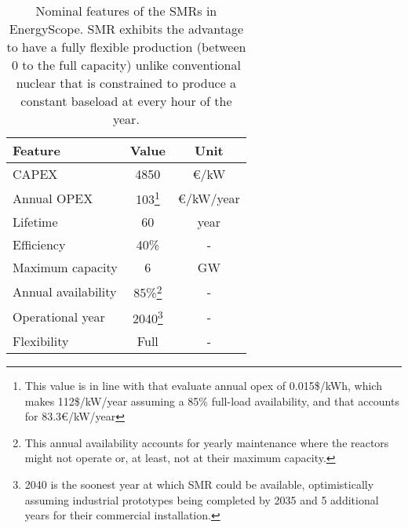 \begin{table}[htbp!]
\caption{Nominal features of the SMRs in EnergyScope. \gls{SMR} exhibits the advantage to have a fully flexible production (\ie between 0 to the full capacity) unlike conventional nuclear that is constrained to produce a constant baseload at every hour of the year.}
\label{tab:SMR_features}
\begin{minipage}{\linewidth}
\centering
\begin{tabular}{l c c}
\toprule
\textbf{Feature} & \textbf{Value} & \textbf{Unit}\\
\midrule
CAPEX & 4850 & €/kW \\
Annual OPEX & 103\footnote{\label{foot:c_maint_SMR}This value is in line with \citet{smr_canada} that evaluate annual opex of 0.015\$/kWh, which makes 112\$/kW/year assuming a 85\% full-load availability, and \citet{PATHS2050} that accounts for 83.3€/kW/year} & €/kW/year \\
Lifetime & 60 & year \\
Efficiency & 40\% & -\\
Maximum capacity & 6 & GW \\
Annual availability & 85\%\footnote{\label{foot:avail_SMR}This annual availability accounts for yearly maintenance where the reactors might not operate or, at least, not at their maximum capacity. } & -\\
Operational year & 2040\footnote{\label{foot:op_year_SMR}2040 is the soonest year at which \gls{SMR} could be available, optimistically assuming industrial prototypes being completed by 2035 and 5 additional years for their commercial installation.} & - \\
Flexibility & Full & - \\
\bottomrule							

\end{tabular}
\end{minipage}
\end{table}


